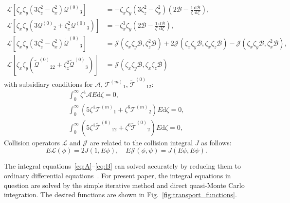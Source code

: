 \documentclass[aip,pof,preprint]{revtex4-1}
\newcommand{\dd}{\mathrm{d}}
\newcommand{\der}[2][]{\frac{\dd#1}{\dd#2}}
\newcommand{\Q}{\ensuremath{\mathcal{Q}^{(0)}}}
\newcommand{\T}[1]{\ensuremath{\mathcal{T}^{(#1)}}}
\newcommand{\TT}{\ensuremath{\tilde{\mathcal{T}}^{(0)}}}
\newcommand{\QQ}{\ensuremath{\tilde{\mathcal{Q}}^{(0)}}}
\begin{document}
\begin{align}
    \mathcal{L}\left[ \zeta_x\zeta_y \left( 3\zeta_z^2-\zeta_x^2 \right)\Q_3 \right]
        &= -\zeta_x\zeta_y\left( 3\zeta_z^2-\zeta_x^2 \right)\left(2\mathcal{B} - \frac1\zeta\der[\mathcal{B}]{\zeta}\right), \label{eq:Q3}\\
    \mathcal{L}\left[ \zeta_x\zeta_y \left( 3\Q_2+\zeta_x^2\Q_3 \right) \right]
        &= -\zeta_x^3\zeta_y\left(2\mathcal{B} - \frac1\zeta\der[\mathcal{B}]{\zeta}\right), \label{eq:Q2}\\
    \mathcal{L}\left[ \zeta_x\zeta_y\left( 3\zeta_z^2 - \zeta_x^2 \right)\QQ_3 \right]
        &= \mathcal{J}\left( \zeta_x\zeta_y\mathcal{B}, \zeta_z^2\mathcal{B} \right)
        + 2\mathcal{J}\left( \zeta_x\zeta_y\mathcal{B}, \zeta_x\zeta_z\mathcal{B} \right)
        - \mathcal{J}\left( \zeta_x\zeta_y\mathcal{B}, \zeta_x^2\mathcal{B} \right), \label{eq:QQ3}\\
    \mathcal{L}\left[ \zeta_x\zeta_y \left( \QQ_{22} + \zeta_z^2\QQ_3 \right) \right]
        &= \mathcal{J}\left( \zeta_x\zeta_y\mathcal{B}, \zeta_x\zeta_z\mathcal{B} \right) \label{eq:QQ2}
\end{align}
with subsidiary conditions for \(\mathcal{A}\), \(\T{m}_1\), \(\TT_{12}\):
\begin{gather}
    \int_0^\infty \zeta^4 \mathcal{A} E \dd\zeta = 0, \label{eq:A_constraint}\\
    \int_0^\infty \left( 5\zeta^4\T{m}_1 + \zeta^6\T{m}_2 \right) E \dd\zeta = 0, \label{eq:Tm_constraint}\\
    \int_0^\infty \left( 5\zeta^4\TT_{12} + \zeta^6\TT_2 \right) E \dd\zeta = 0, \label{eq:T12_constraint}
\end{gather}
Collision operators \(\mathcal{L}\) and \(\mathcal{J}\) are related to the collision integral \(J\) as follows:
\begin{equation}\label{eq:mathcalLJ}
    E\mathcal{L}(\phi) = 2J(1, E\phi), \quad E\mathcal{J}(\phi, \psi) = J(E\phi, E\psi).
\end{equation}

The integral equations~\eqref{eq:A}--\eqref{eq:B} can solved accurately
by reducing them to ordinary differential equations~\cite{Pekeris1957, Ohwada1992}.
For present paper, the integral equations in question are solved
by the simple iterative method and direct quasi-Monte Carlo integration.
The desired functions are shown in Fig.~\ref{fig:transport_functions}.
\end{document}
